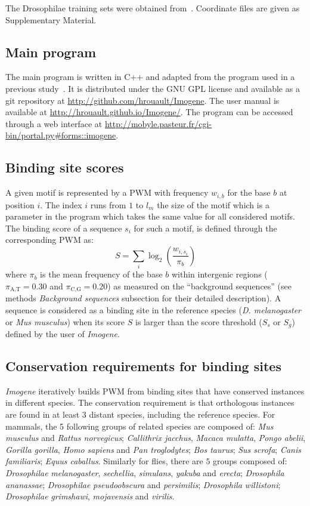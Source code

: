 \documentclass[a4,center,fleqn]{NAR}
\newcommand{\pa}{\pi_\textrm{A,T}}
\newcommand{\pc}{\pi_\textrm{C,G}}
\begin{document}
The Drosophilae training sets were obtained from~\cite{pmid19890324}.
Coordinate files are given as Supplementary Material.



\subsection*{Main program}

The main program is written in C++ and adapted from the program used in
a previous study~\cite{Rouault:2010fk}.
It is distributed under the GNU GPL license and available as a git repository
at \url{http://github.com/hrouault/Imogene}.
The user manual is available at \url{http://hrouault.github.io/Imogene/}.
The program can be accessed through a web
interface at \url{http://mobyle.pasteur.fr/cgi-bin/portal.py#forms::imogene}.

\subsection*{Binding site scores}

A given motif is represented by a PWM with frequency $w_{i,b}$ for the base $b$
at position $i$.
The index $i$ runs from $1$ to $l_m$ the size of the motif which is a parameter
in the program which takes the same value for all considered motifs.
The binding score of a sequence $s_i$ for such a motif, is defined through the
corresponding PWM as:
\begin{equation}
    S=\sum_{i}\log_2\left(\frac{ w_{i,s_i}}{\pi_b}\right)
    \label{score_bs}
\end{equation}
where $\pi_b$ is the mean frequency of  the base $b$ within intergenic regions
($\pa=0.30$ and $\pc=0.20$) as measured on the ``background sequences'' (see
methods {\em Background sequences } subsection for their detailed description).
A sequence is considered as a binding site in the reference species ({\em D.
melanogaster} or  {\em Mus musculus}) when its score $S$ is larger than the
score threshold ($S_s$ or $S_g$) defined by the user of \textit{Imogene}.

\subsection*{Conservation requirements for binding sites} 
{\em Imogene} iteratively builds PWM from binding sites that have conserved
instances in different species.
The conservation requirement is that orthologous instances are found in at
least 3 distant species, including the reference species.
For mammals, the 5 following groups of related species are composed of: {\em
Mus musculus} and {\em Rattus norvegicus}; {\em Callithrix jacchus}, {\em
Macaca mulatta}, {\em Pongo abelii}, {\em Gorilla gorilla}, {\em Homo sapiens}
and {\em Pan troglodytes};  {\em Bos taurus}; {\em Sus scrofa}; {\em Canis
familiaris}; {\em Equus caballus}.
Similarly for flies, there are $5$ groups composed of:
{\em Drosophilae} {\em melanogaster}, {\em sechellia}, 
{\em simulans}, {\em yakuba} and {\em erecta};
{\em Drosophila} {\em ananassae};
{\em Drosophilae} {\em pseudoobscura} and {\em persimilis};
 {\em Drosophila} {\em willistoni};
 {\em Drosophilae} {\em grimshawi}, {\em mojavensis} and {\em virilis}.
\end{document}
